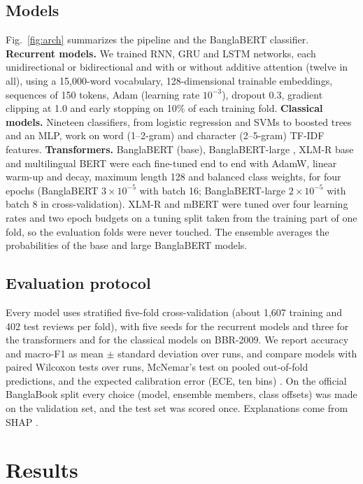 \documentclass[conference,a4paper]{IEEEtran}
\begin{document}
\subsection{Models}
Fig.~\ref{fig:arch} summarizes the pipeline and the BanglaBERT classifier. \textbf{Recurrent models.} We trained RNN, GRU and LSTM networks, each unidirectional or bidirectional and with or without additive attention (twelve in all), using a 15,000-word vocabulary, 128-dimensional trainable embeddings, sequences of 150 tokens, Adam (learning rate $10^{-3}$), dropout 0.3, gradient clipping at 1.0 and early stopping on 10\% of each training fold. \textbf{Classical models.} Nineteen classifiers, from logistic regression and SVMs to boosted trees and an MLP, work on word (1--2-gram) and character (2--5-gram) TF-IDF features. \textbf{Transformers.} BanglaBERT (base), BanglaBERT-large \cite{bhattacharjee2022}, XLM-R base and multilingual BERT were each fine-tuned end to end with AdamW, linear warm-up and decay, maximum length 128 and balanced class weights, for four epochs (BanglaBERT $3\times10^{-5}$ with batch 16; BanglaBERT-large $2\times10^{-5}$ with batch 8 in cross-validation). XLM-R and mBERT were tuned over four learning rates and two epoch budgets on a tuning split taken from the training part of one fold, so the evaluation folds were never touched. The ensemble averages the probabilities of the base and large BanglaBERT models.

\subsection{Evaluation protocol}
Every model uses stratified five-fold cross-validation (about 1,607 training and 402 test reviews per fold), with five seeds for the recurrent models and three for the transformers and for the classical models on BBR-2009. We report accuracy and macro-F1 as mean $\pm$ standard deviation over runs, and compare models with paired Wilcoxon tests over runs, McNemar's test \cite{mcnemar1947} on pooled out-of-fold predictions, and the expected calibration error (ECE, ten bins) \cite{guo2017}. On the official BanglaBook split every choice (model, ensemble members, class offsets) was made on the validation set, and the test set was scored once. Explanations come from SHAP \cite{lundberg2017}.

\section{Results}\label{sec:results}
\end{document}
